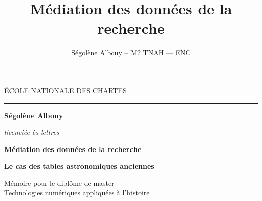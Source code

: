 \documentclass[a4paper,12pt,twoside]{book}
\author{Ségolène Albouy – M2 TNAH — ENC }
\title{Médiation des données de la recherche}
\newcommand{\g}[1]{\og#1~\fg}
\begin{document}
	\onehalfspacing 
	
	\frontmatter
	\begin{titlepage}
		\begin{center}
			
			\bigskip
			
			\begin{large}
				ÉCOLE NATIONALE DES CHARTES
			\end{large}
			\begin{center}\rule{2cm}{0.02cm}\end{center}
			
			\bigskip
			\bigskip
			\bigskip
			\begin{Large}
				\textbf{Ségolène Albouy}\\
			\end{Large}
			\begin{normalsize} \textit{licenciée ès lettres}\\
			\end{normalsize}
			
			\bigskip
			\bigskip
			\bigskip
			
			\begin{Huge}
				\textbf{Médiation des données de la recherche}\\
			\end{Huge}
			\bigskip
			\bigskip
			\begin{LARGE}
				\textbf{Le cas des tables astronomiques anciennes}\\
			\end{LARGE}
			
			\bigskip
			\bigskip
			\bigskip
			\begin{large}
			\end{large}
			\vfill
			
			\begin{large}
				Mémoire 
				pour le diplôme de master \\
				\g{Technologies numériques appliquées à l'histoire} \\
			\end{large}
			
		\end{center}
	\end{titlepage}
	
	\thispagestyle{empty}	
	\cleardoublepage
	
\end{document}
